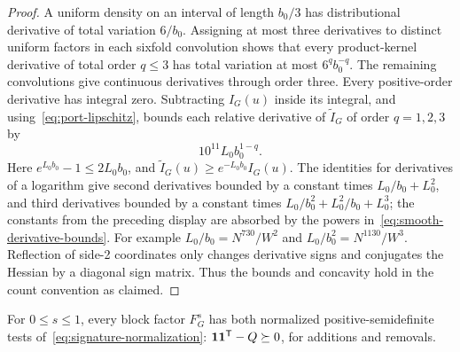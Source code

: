 \begin{proof}
A uniform density on an interval of length $b_0/3$ has distributional
derivative of total variation $6/b_0$. Assigning at most three
derivatives to distinct uniform factors in each sixfold convolution
shows that every product-kernel derivative of total order $q\le3$
has total variation at most $6^qb_0^{-q}$. The remaining convolutions
give continuous derivatives through order three. Every positive-order
derivative has integral zero. Subtracting $I_G(u)$ inside its integral,
and using~\eqref{eq:port-lipschitz}, bounds each relative derivative of
$\widetilde I_G$ of order $q=1,2,3$ by
\[
 10^{11}L_0b_0^{1-q}.
\]
Here $e^{L_0b_0}-1\le2L_0b_0$, and
$\widetilde I_G(u)\ge e^{-L_0b_0}I_G(u)$.
The identities for derivatives of a logarithm give second derivatives
bounded by a constant times
$L_0/b_0+L_0^2$, and third derivatives bounded by a constant times
$L_0/b_0^2+L_0^2/b_0+L_0^3$; the constants from the preceding display
are absorbed by the powers in~\eqref{eq:smooth-derivative-bounds}.
For example $L_0/b_0=N^{730}/W^2$ and
$L_0/b_0^2=N^{1130}/W^3$. Reflection of side-2 coordinates only changes
derivative signs and conjugates the Hessian by a diagonal sign matrix.
Thus the bounds and concavity hold in the count convention as claimed.
\end{proof}

\begin{lemma}\label{lem:block-signatures}
For $0\le s\le1$, every block factor $F_G^s$ has both normalized
positive-semidefinite tests of~\eqref{eq:signature-normalization}:
$\mathbf 1\mathbf 1^{\mathsf T}-Q\succeq0$, for additions and removals.
\end{lemma}

